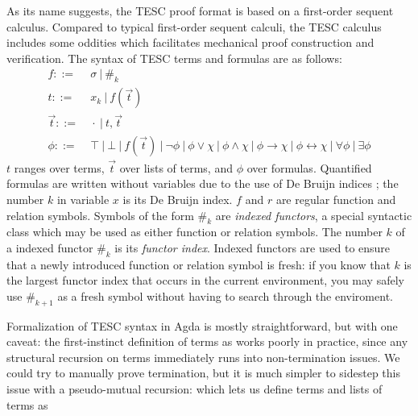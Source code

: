 \documentclass[12pt]{article}
\newcommand{\idf}[1]{\#_{#1}}
\begin{document}
As its name suggests, the TESC proof format is based on a first-order 
sequent calculus. Compared to typical first-order sequent calculi, the
TESC calculus includes some oddities which facilitates mechanical proof 
construction and verification. The syntax of TESC terms and formulas are 
as follows:
\begin{align*}
f ::= &\ \sigma\ |\ \idf{k}\\
t ::= &\ x_k\ |\ f(\vec{t})\\
\vec{t} ::= &\ \cdot\ |\ t, \vec{t}\\
\phi ::= &\ \top\ |\ \bot\ |\ f(\vec{t})\ |\ \lnot \phi\ |\ \phi \lor \chi\ |\ \phi \land \chi\ |\ \phi \to \chi\ |\ \phi \leftrightarrow \chi\ |\ \forall \phi\ |\ \exists \phi
\end{align*}
$t$ ranges over terms, $\vec{t}$ over lists of terms, and $\phi$ over formulas.
Quantified formulas are written without variables due to the use of De Bruijn 
indices \cite{}; the number $k$ in variable $x$ is its De Bruijn index. 
$f$ and $r$ are regular function and relation symbols. Symbols of the 
form $\idf{k}$ are \textit{indexed functors}, a special syntactic class
which may be used as either function or relation symbols. The number $k$ of 
a indexed functor $\idf{k}$ is its \textit{functor index}. Indexed 
functors are used to ensure that a newly introduced function or relation 
symbol is fresh: if you know that $k$ is the largest functor index that 
occurs in the current environment, you may safely use $\idf{k+1}$ as a 
fresh symbol without having to search through the enviroment.

Formalization of TESC syntax in Agda is mostly straightforward, but with one 
caveat: the first-instinct definition of terms as 
works poorly in practice, since any structural recursion on terms immediately 
runs into non-termination issues. We could try to manually prove termination,
but it is much simpler to sidestep this issue with a pseudo-mutual recursion:
which lets us define terms and lists of terms as



\end{document}
